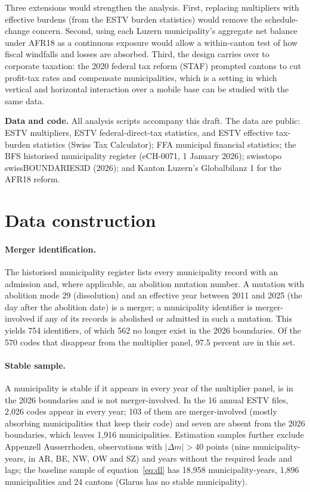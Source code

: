 \documentclass[11pt,a4paper]{article}
\begin{document}
Three extensions would strengthen the analysis. First, replacing multipliers with effective burdens (from the ESTV burden statistics) would remove the schedule-change concern. Second, using each Luzern municipality's aggregate net balance under AFR18 as a continuous exposure would allow a within-canton test of how fiscal windfalls and losses are absorbed. Third, the design carries over to corporate taxation: the 2020 federal tax reform (STAF) prompted cantons to cut profit-tax rates and compensate municipalities, which is a setting in which vertical and horizontal interaction over a mobile base can be studied with the same data.

\bigskip\noindent\textbf{Data and code.} All analysis scripts accompany this draft. The data are public: ESTV multipliers, ESTV federal-direct-tax statistics, and ESTV effective tax-burden statistics (Swiss Tax Calculator); FFA municipal financial statistics; the BFS historised municipality register (eCH-0071, 1 January 2026); swisstopo swissBOUNDARIES3D (2026); and Kanton Luzern's Globalbilanz 1 for the AFR18 reform.

\renewcommand{\bibfont}{\small}



\appendix
\section{Data construction}\label{app:data}
\paragraph{Merger identification.} The historised municipality register lists every municipality record with an admission and, where applicable, an abolition mutation number. A mutation with abolition mode 29 (dissolution) and an effective year between 2011 and 2025 (the day after the abolition date) is a merger; a municipality identifier is merger-involved if any of its records is abolished or admitted in such a mutation. This yields 754 identifiers, of which 562 no longer exist in the 2026 boundaries. Of the 570 codes that disappear from the multiplier panel, 97.5 percent are in this set.

\paragraph{Stable sample.} A municipality is stable if it appears in every year of the multiplier panel, is in the 2026 boundaries and is not merger-involved. In the 16 annual ESTV files, 2,026 codes appear in every year; 103 of them are merger-involved (mostly absorbing municipalities that keep their code) and seven are absent from the 2026 boundaries, which leaves 1,916 municipalities. Estimation samples further exclude Appenzell Ausserrhoden, observations with $|\Delta m|>40$ points (nine municipality-years, in AR, BE, NW, OW and SZ) and years without the required leads and lags; the baseline sample of equation~\eqref{eq:dl} has 18,958 municipality-years, 1,896 municipalities and 24 cantons (Glarus has no stable municipality).
\end{document}
